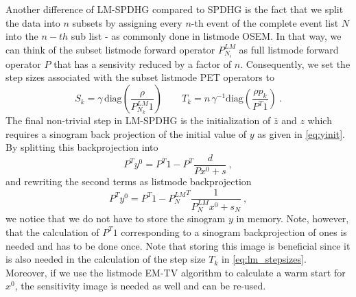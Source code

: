 Another difference of LM-SPDHG compared to SPDHG is the fact that we split the data into $n$ subsets by
assigning every $n$-th event of the complete event list $N$ into the $n-th$ sub list - 
as commonly done in listmode OSEM.
In that way, we can think of the subset listmode forward operator $P^{LM}_{N_i}$
as full listmode forward operator $P$ that has a sensivity reduced by a factor of $n$.
Consequently, we set the step sizes associated with the subset listmode PET operators to
%
\begin{equation}
S_k = \gamma \, \text{diag}(\frac{\rho}{P^{LM}_{N_k} 1} )\qquad  T_k = n\,\gamma^{-1} \text{diag}(\frac{\rho p_k}{P^T 1}) \ . 
\label{eq:lm_stepsizes}
\end{equation}
% 
The final non-trivial step in LM-SPDHG is the initialization of $\bar{z}$ and $z$ which requires
a sinogram back projection of the initial value of $y$ as given in \eqref{eq:yinit}.
By splitting this backprojection into
%
\begin{equation}
P^T y^0 = P^T 1 - P^T \frac{d}{Px^0 + s} \ ,
\end{equation}
%
and rewriting the second terms as listmode backprojection
%
\begin{equation}
P^T y^0 = P^T 1 - {P^{LM}_{N}}^T \frac{1}{P^{LM}_N x^0 + s_N} \ ,
\label{eq:zinit_lm}
\end{equation}
%
we notice that we do not have to store the sinogram $y$ in memory.
Note, however, that the calculation of $P^T 1$ corresponding to a sinogram backprojection of ones
is needed and has to be done once.
Note that storing this image is beneficial since it
is also needed in the calculation of the step size $T_k$ in \eqref{eq:lm_stepsizes}.
Moreover, if we use the listmode EM-TV algorithm to calculate a warm start for $x^0$, 
the sensitivity image is needed as well and can be re-used.

